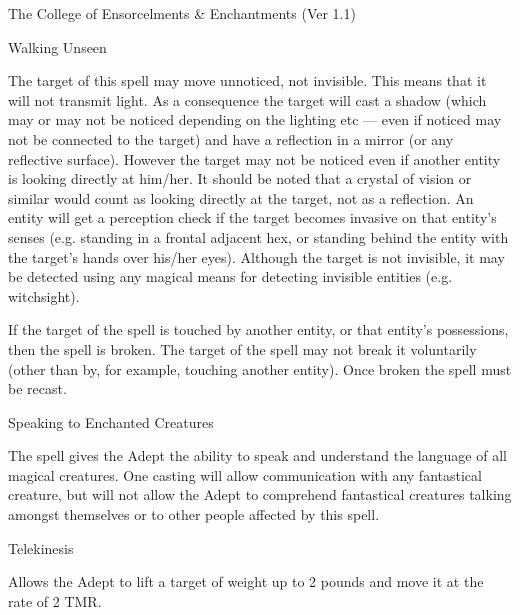 \begin{Chapter}{The College of Ensorcelments \& Enchantments (Ver 1.1)}
\begin{spell}[G-4]{Walking Unseen}

\begin{effects}
The target of this spell may move unnoticed, not invisible.  This
means that it will not transmit light. As a consequence the target
will cast a shadow (which may or may not be noticed depending on the
lighting etc — even if noticed may not be connected to the target) and
have a reflection in a mirror (or any reflective surface).  However
the target may not be noticed even if another entity is looking
directly at him/her.  It should be noted that a crystal of vision or
similar would count as looking directly at the target, not as a
reflection.  An entity will get a perception check if the target
becomes invasive on that entity’s senses (e.g. standing in a frontal
adjacent hex, or standing behind the entity with the target’s hands
over his/her eyes). Although the target is not invisible, it may be
detected using any magical means for detecting invisible entities
(e.g. witchsight).

If the target of the spell is touched by another entity, or that
entity’s possessions, then the spell is broken.  The target of the
spell may not break it voluntarily (other than by, for example,
touching another entity).  Once broken the spell must be recast.
\end{effects}
\end{spell}

\begin{spell}[G-5]{Speaking to Enchanted Creatures}

\begin{effects}
The spell gives the Adept the ability to speak and understand the
language of all magical creatures.  One casting will allow
communication with any fantastical creature, but will not allow the
Adept to comprehend fantastical creatures talking amongst themselves
or to other people affected by this spell.
\end{effects}
\end{spell}

\begin{spell}[G-2]{Telekinesis}
\begin{effects}
Allows the Adept to lift a target of weight up to 2 pounds and move it
at the rate of 2 TMR.
\end{effects}
\end{spell}


\end{Chapter}
